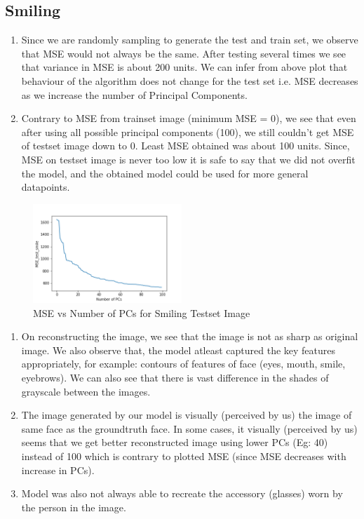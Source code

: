\documentclass[11pt,letterpaper]{article}
\begin{document}
\subsection*{Smiling}
\begin{enumerate}
    [label=$\bullet$]
    \item Since we are randomly sampling to generate the test and train set, we observe that MSE would not always be the same. After testing several times we see that variance in MSE is about 200 units. We can infer from above plot that behaviour of the algorithm does not change for the test set i.e. MSE decreases as we increase the number of Principal Components.
    \item Contrary to MSE from trainset image (minimum MSE = 0), we see that even after using all possible principal components (100), we still couldn't get MSE of testset image down to 0. Least MSE obtained was about 100 units. Since, MSE on testset image is never too low it is safe to say that we did not overfit the model, and the obtained model could be used for more general datapoints.
\end{enumerate}
\begin{figure}[htbp]
    \centering
    \includegraphics*[width=0.5\textwidth]{../outputs/ans4/MSE_test_smile.png}
    \caption{MSE vs Number of PCs for Smiling Testset Image}
    \end{figure}
\begin{enumerate}
    [label=$\bullet$]
    \item On reconstructing the image, we see that the image is not as sharp as original image. We also observe that, the model atleast captured the key features appropriately, for example: contours of features of face (eyes, mouth, smile, eyebrows). We can also see that there is vast difference in the shades of grayscale between the images.
    \item The image generated by our model is visually (perceived by us) the image of same face as the groundtruth face. In some cases, it visually (perceived by us) seems that we get better reconstructed image using lower PCs (Eg: 40) instead of 100 which is contrary to plotted MSE (since MSE decreases with increase in PCs).
    \item Model was also not always able to recreate the accessory (glasses) worn by the person in the image.
\end{enumerate}
\end{document}
